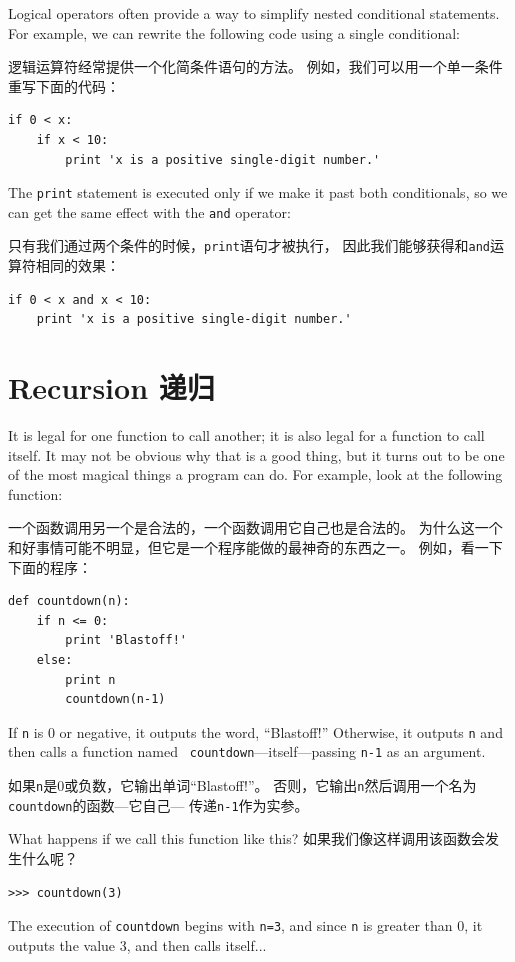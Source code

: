 \documentclass[10pt]{book}
\begin{document}
\begin{CJK}{UTF8}{gbsn}
Logical operators often provide a way to simplify nested conditional
statements.  For example, we can rewrite the following code using a
single conditional:

逻辑运算符经常提供一个化简条件语句的方法。
例如，我们可以用一个单一条件重写下面的代码：

\begin{verbatim}
if 0 < x:
    if x < 10:
        print 'x is a positive single-digit number.'
\end{verbatim}
%
The {\tt print} statement is executed only if we make it past both
conditionals, so we can get the same effect with the {\tt and} operator:

只有我们通过两个条件的时候，{\tt print}语句才被执行，
因此我们能够获得和{\tt and}运算符相同的效果：

\begin{verbatim}
if 0 < x and x < 10:
    print 'x is a positive single-digit number.'
\end{verbatim}


\section{Recursion 递归}
\label{recursion}

It is legal for one function to call another;
it is also legal for a function to call itself.  It may not be obvious
why that is a good thing, but it turns out to be one of the most
magical things a program can do.
For example, look at the following function:

一个函数调用另一个是合法的，一个函数调用它自己也是合法的。
为什么这一个和好事情可能不明显，但它是一个程序能做的最神奇的东西之一。
例如，看一下下面的程序：

\begin{verbatim}
def countdown(n):
    if n <= 0:
        print 'Blastoff!'
    else:
        print n
        countdown(n-1)
\end{verbatim}
%
If {\tt n} is 0 or negative, it outputs the word, ``Blastoff!''
Otherwise, it outputs {\tt n} and then calls a function named {\tt
countdown}---itself---passing {\tt n-1} as an argument.

如果{\tt n}是0或负数，它输出单词``Blastoff!''。
否则，它输出{\tt n}然后调用一个名为{\tt countdown}的函数---它自己---
传递{\tt n-1}作为实参。

What happens if we call this function like this?
如果我们像这样调用该函数会发生什么呢？

\begin{verbatim}
>>> countdown(3)
\end{verbatim}
%
The execution of {\tt countdown} begins with {\tt n=3}, and since
{\tt n} is greater than 0, it outputs the value 3, and then calls itself...


\end{CJK}
\end{document}

